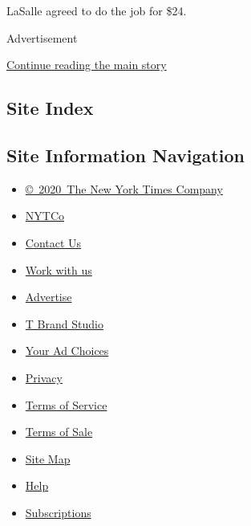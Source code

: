 LaSalle agreed to do the job for \$24.

Advertisement

\protect\hyperlink{after-bottom}{Continue reading the main story}

\hypertarget{site-index}{%
\subsection{Site Index}\label{site-index}}

\hypertarget{site-information-navigation}{%
\subsection{Site Information
Navigation}\label{site-information-navigation}}

\begin{itemize}
\tightlist
\item
  \href{https://help.nytimes3xbfgragh.onion/hc/en-us/articles/115014792127-Copyright-notice}{©~2020~The
  New York Times Company}
\end{itemize}

\begin{itemize}
\tightlist
\item
  \href{https://www.nytco.com/}{NYTCo}
\item
  \href{https://help.nytimes3xbfgragh.onion/hc/en-us/articles/115015385887-Contact-Us}{Contact
  Us}
\item
  \href{https://www.nytco.com/careers/}{Work with us}
\item
  \href{https://nytmediakit.com/}{Advertise}
\item
  \href{http://www.tbrandstudio.com/}{T Brand Studio}
\item
  \href{https://www.nytimes3xbfgragh.onion/privacy/cookie-policy\#how-do-i-manage-trackers}{Your
  Ad Choices}
\item
  \href{https://www.nytimes3xbfgragh.onion/privacy}{Privacy}
\item
  \href{https://help.nytimes3xbfgragh.onion/hc/en-us/articles/115014893428-Terms-of-service}{Terms
  of Service}
\item
  \href{https://help.nytimes3xbfgragh.onion/hc/en-us/articles/115014893968-Terms-of-sale}{Terms
  of Sale}
\item
  \href{https://spiderbites.nytimes3xbfgragh.onion}{Site Map}
\item
  \href{https://help.nytimes3xbfgragh.onion/hc/en-us}{Help}
\item
  \href{https://www.nytimes3xbfgragh.onion/subscription?campaignId=37WXW}{Subscriptions}
\end{itemize}
